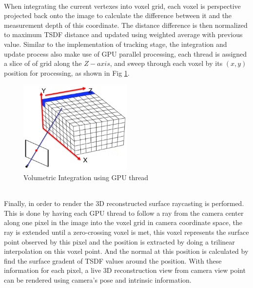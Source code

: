 \documentclass[12pt,twoside]{article}
\begin{document}
\\
When integrating the current vertexes into voxel grid, each voxel is perspective projected back onto the image to calculate the difference between it and the measurement depth of this coordinate. The distance difference is then normalized to maximum TSDF distance and updated using weighted average with   previous value. Similar to the implementation of tracking stage, the integration and update process also make use of GPU parallel processing, each thread is assigned a slice of of grid along the $Z-axis$, and sweep through each voxel by its $(x,y)$ position for processing, as shown in Fig \ref{fig:kin}.\\
\begin{figure}[h]
    \centering
    \includegraphics[width=0.5\textwidth]{figures/kin}
    \caption{Volumetric Integration using GPU thread \cite{1_yin_2016}}
    \label{fig:kin}
\end{figure}\\
Finally, in order to render the 3D reconstructed surface raycasting is performed. This is done by having each GPU thread to follow a ray from the camera center along one pixel in the image into the voxel grid in camera coordinate space, the ray is extended until a zero-crossing voxel is met, this voxel represents the surface point observed by this pixel and the position is extracted by doing a trilinear interpolation on this voxel point. And the normal at this position is calculated by find the surface gradent of TSDF values around the position. With these information for each pixel, a live 3D reconstruction view from camera view point can be rendered using camera's pose and intrinsic information.
\end{document}
